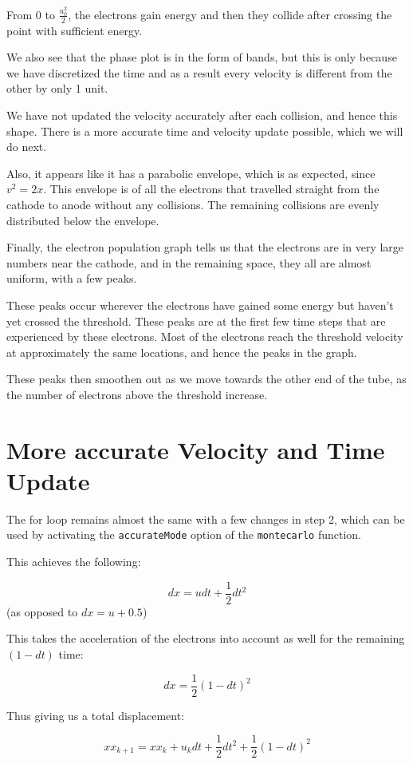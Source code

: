 \documentclass[12pt]{article}
\begin{document}
From 0 to $\frac{u_0^2}{2}$, the electrons gain energy and then they collide after crossing the point with sufficient energy.

We also see that the phase plot is in the form of bands, but this is only because we have discretized the time and as a result every velocity is different from the other by only 1 unit.

We have not updated the velocity accurately after each collision, and hence this shape. There is a more accurate time and velocity update possible, which we will do next.

Also, it appears like it has a parabolic envelope, which is as expected, since $v^2 = 2x$. This envelope is of all the electrons that travelled straight from the cathode to anode without any collisions. The remaining collisions are evenly distributed below the envelope.

Finally, the electron population graph tells us that the electrons are in very large numbers near the cathode, and in the remaining space, they all are almost uniform, with a few peaks.

These peaks occur wherever the electrons have gained some energy but haven't yet crossed the threshold. These peaks are at the first few time steps that are experienced by these electrons. Most of the electrons reach the threshold velocity at approximately the same locations, and hence the peaks in the graph.

These peaks then smoothen out as we move towards the other end of the tube, as the number of electrons above the threshold increase.

\section{More accurate Velocity and Time Update}

The for loop remains almost the same with a few changes in step 2, which can be used by activating the \texttt{accurateMode} option of the \texttt{montecarlo} function.

This achieves the following:

$$dx = udt+\frac{1}{2}dt^2$$
(as opposed to $dx = u+0.5$)

This takes the acceleration of the electrons into account as well for the remaining $(1-dt)$ time:

$$dx = \frac{1}{2} (1-dt)^2$$

Thus giving us a total displacement:

$$xx_{k+1} = xx_{k}+u_{k}dt+\frac{1}{2}dt^2+\frac{1}{2} (1-dt)^2$$
\end{document}

